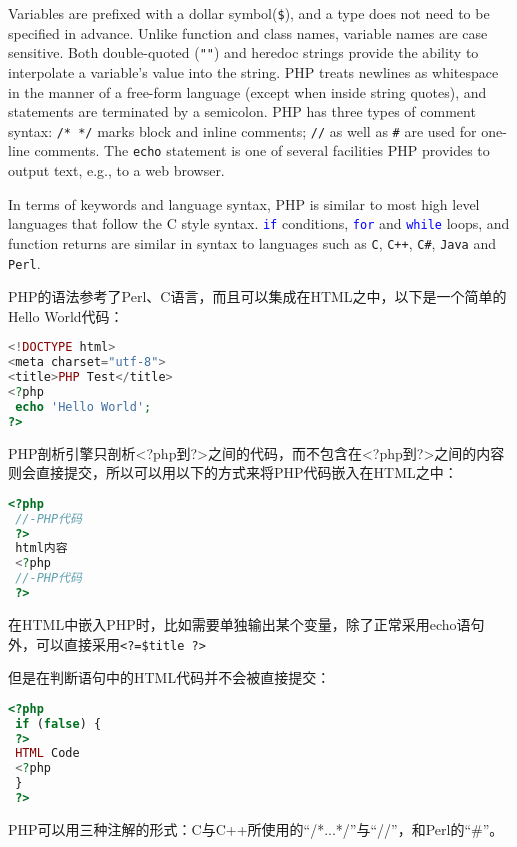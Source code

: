 Variables are prefixed with a dollar symbol(\texttt{\$}), and a type does not need to be specified in advance. Unlike function and class names, variable names are case sensitive. Both double-quoted (\texttt{""}) and heredoc strings provide the ability to interpolate a variable's value into the string. PHP treats newlines as whitespace in the manner of a free-form language (except when inside string quotes), and statements are terminated by a semicolon. PHP has three types of comment syntax: \texttt{/* */} marks block and inline comments; \texttt{//} as well as \texttt{\#} are used for one-line comments. The \texttt{echo} statement is one of several facilities PHP provides to output text, e.g., to a web browser.




In terms of keywords and language syntax, PHP is similar to most high level languages that follow the C style syntax. \texttt{\textcolor{Blue}{if}} conditions, \texttt{\textcolor{Blue}{for}} and \texttt{\textcolor{Blue}{while}} loops, and function returns are similar in syntax to languages such as \texttt{C}, \texttt{C++}, \texttt{C\#}, \texttt{Java} and \texttt{Perl}.

PHP的语法参考了Perl、C语言，而且可以集成在HTML之中，以下是一个简单的Hello World代码：

\begin{lstlisting}[language=PHP]
<!DOCTYPE html>
<meta charset="utf-8">
<title>PHP Test</title>
<?php
 echo 'Hello World';
?>
\end{lstlisting}

PHP剖析引擎只剖析<?php到?>之间的代码，而不包含在<?php到?>之间的内容则会直接提交，所以可以用以下的方式来将PHP代码嵌入在HTML之中：

\begin{lstlisting}[language=PHP]
 <?php
 //-PHP代码
 ?>
 html内容
 <?php
 //-PHP代码
 ?>
\end{lstlisting}

在HTML中嵌入PHP时，比如需要单独输出某个变量，除了正常采用echo语句外，可以直接采用\verb|<?=$title ?>|

但是在判断语句中的HTML代码并不会被直接提交：


\begin{lstlisting}[language=PHP]
<?php
 if (false) {
 ?>
 HTML Code
 <?php
 }
 ?>
\end{lstlisting}

PHP可以用三种注解的形式：C与C++所使用的“/*...*/”与“//”，和Perl的“\#”。




